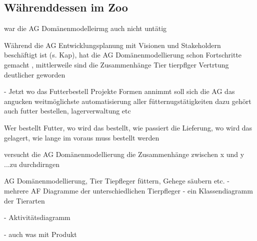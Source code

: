 \subsection{Währenddessen im Zoo}
\label{sec:Kap-6.3.3}

war die AG Domänenmodelleirmg auch nicht untätig

Während die AG Entwicklungsplanung mit Visionen und Stakeholdern beschäftigt ist (s. Kap), hat die AG Domänenmodellierung schon Fortschritte gemacht , mittlerweile sind die Zusammenhänge Tier tierpflger Vertrtung deutlicher geworden

- Jetzt wo das Futterbestell Projekte Formen annimmt soll sich die AG das angucken
weitmöglichste automatisierung aller fütternugstätigkeiten dazu gehört auch futter bestellen, lagerverwaltung etc

Wer bestellt Futter, wo wird das bestellt, wie passiert die Lieferung, wo wird das gelagert, wie lange im voraus muss bestellt werden



versucht die AG Domänenmodellierung die Zusammenhänge zwischen x und y ...zu durchdirngen


AG Domänenmodellierung, Tier Tiepfleger füttern, Gehege säubern etc.
- mehrere AF Diagramme der unterschiedlichen Tierpfleger
- ein Klassendiagramm der Tierarten


- Aktivitätsdiagramm



- auch was mit Produkt








